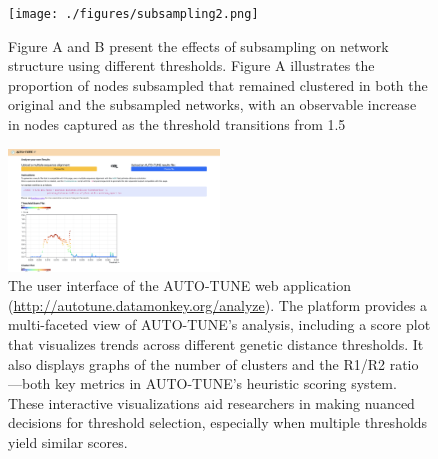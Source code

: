 \documentclass[utf8]{FrontiersinHarvard} %
\begin{document}
\begin{figure}[h!]
	\centering
	\texttt{[image: ./figures/subsampling2.png]}
	\caption{
		Figure A and B present the effects of subsampling on network structure using different thresholds. Figure A illustrates the proportion of nodes subsampled that remained clustered in both the original and the subsampled networks, with an observable increase in nodes captured as the threshold transitions from 1.5%
	}\label{fig:subsampling2}
\end{figure}

\begin{figure}[h!]
	\centering
	\includegraphics[width=0.5\textwidth]{./figures/webapp.png}
	\caption{ The user interface of the AUTO-TUNE web application
		(\url{http://autotune.datamonkey.org/analyze}). The platform provides a
		multi-faceted view of AUTO-TUNE's analysis, including a score plot that
		visualizes trends across different genetic distance thresholds. It also
		displays graphs of the number of clusters and the R1/R2 ratio—both key metrics
		in AUTO-TUNE's heuristic scoring system. These interactive visualizations aid
		researchers in making nuanced decisions for threshold selection, especially
		when multiple thresholds yield similar scores.
	}\label{fig:webapp}
\end{figure}
\end{document}
